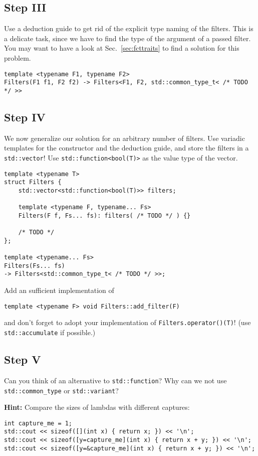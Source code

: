 \documentclass{scrartcl}
\begin{document}
\subsection{Step III}
Use a deduction guide to get rid of the explicit type naming of the filters. This is a delicate task, since we have to find the type of the argument of a passed filter. You may want to have a look at Sec.~\ref{sec:fcttraits} to find a solution for this problem.
\begin{lstlisting}
template <typename F1, typename F2>
Filters(F1 f1, F2 f2) -> Filters<F1, F2, std::common_type_t< /* TODO */ >>
\end{lstlisting}

\subsection{Step IV}
We now generalize our solution for an arbitrary number of filters. Use variadic templates for the constructor and the deduction guide, and store the filters in a \texttt{std::vector}! Use \texttt{std::function<bool(T)>} as the value type of the vector.

\begin{lstlisting}
template <typename T>
struct Filters {
    std::vector<std::function<bool(T)>> filters;

    template <typename F, typename... Fs>
    Filters(F f, Fs... fs): filters( /* TODO */ ) {}
    
    /* TODO */
};

template <typename... Fs>
Filters(Fs... fs)
-> Filters<std::common_type_t< /* TODO */ >>;
\end{lstlisting}
Add an sufficient implementation of
\begin{lstlisting}
template <typename F> void Filters::add_filter(F)
\end{lstlisting}
and don't forget to adopt your implementation of \texttt{Filters.operator()(T)}! (use \texttt{std::accumulate} if possible.)

\subsection{Step V}
Can you think of an alternative to \texttt{std::function}? Why can we not use \texttt{std::common\_type} or \texttt{std::variant}?

\textbf{Hint:} Compare the sizes of lambdas with different captures:
\begin{lstlisting}[title=\href{https://godbolt.org/z/ZBUfgY}{\texttt{godbolt.org/z/ZBUfgY}}]
int capture_me = 1;
std::cout << sizeof([](int x) { return x; }) << '\n';
std::cout << sizeof([y=capture_me](int x) { return x + y; }) << '\n';
std::cout << sizeof([y=&capture_me](int x) { return x + y; }) << '\n';
\end{lstlisting}
\end{document}
